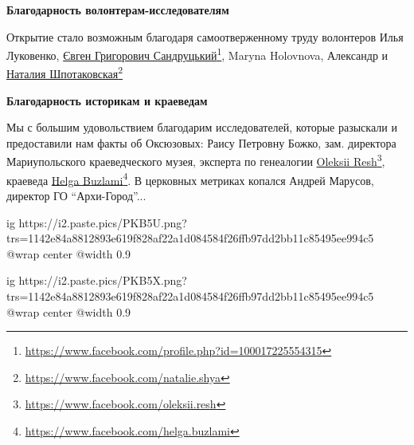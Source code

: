 \textbf{Благодарность волонтерам-исследователям}

Открытие стало возможным благодаря самоотверженному труду волонтеров Илья
Луковенко, \href{https://www.facebook.com/profile.php?id=100017225554315}{Євген Григорович Сандруцький}\footnote{\url{https://www.facebook.com/profile.php?id=100017225554315}}, Maryna Holovnova, Александр и \href{https://www.facebook.com/natalie.shya}{Наталия
Шпотаковская}\footnote{\url{https://www.facebook.com/natalie.shya}}

\textbf{Благодарность историкам и краеведам}

Мы с большим удовольствием благодарим исследователей, которые разыскали и
предоставили нам факты об Оксюзовых: Раису Петровну Божко, зам. директора
Мариупольского краеведческого музея, эксперта по генеалогии
\href{https://www.facebook.com/oleksii.resh}{Oleksii
Resh}\footnote{\url{https://www.facebook.com/oleksii.resh}}, краеведа
\href{https://www.facebook.com/helga.buzlami}{Helga
Buzlami}\footnote{\url{https://www.facebook.com/helga.buzlami}}. В церковных
метриках копался Андрей Марусов, директор ГО \enquote{Архи-Город}...

\ifcmt
  ig https://i2.paste.pics/PKB5U.png?trs=1142e84a8812893e619f828af22a1d084584f26ffb97dd2bb11c85495ee994c5
  @wrap center
  @width 0.9
\fi

\ifcmt
  ig https://i2.paste.pics/PKB5X.png?trs=1142e84a8812893e619f828af22a1d084584f26ffb97dd2bb11c85495ee994c5
  @wrap center
  @width 0.9
\fi

